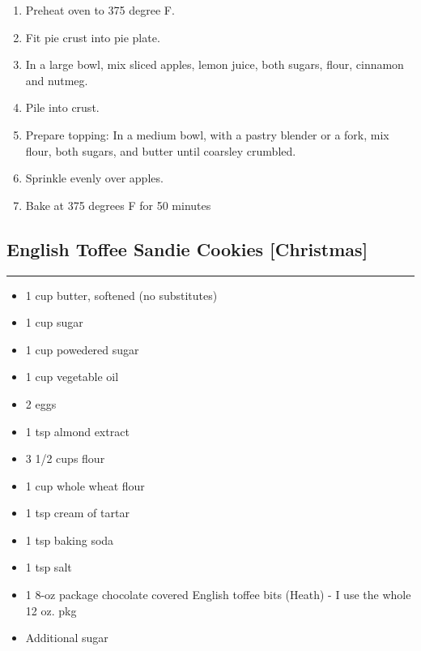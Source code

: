 \documentclass{article}
\begin{document}
\begin{enumerate}
    \item 
        Preheat oven to 375 degree F.
    \item
        Fit pie crust into pie plate.
    \item 
        In a large bowl, mix sliced apples, lemon juice, both sugars, flour, cinnamon and nutmeg.
    \item 
        Pile into crust.
    \item
        Prepare topping: In a medium bowl, with a pastry blender or a fork, mix flour, both sugars, and butter until coarsley crumbled.
    \item
        Sprinkle evenly over apples.
    \item 
        Bake at 375 degrees F for 50 minutes
\end{enumerate}
\newpage

\subsection{English Toffee Sandie Cookies [Christmas]} 
\noindent\rule[0.5ex]{\linewidth}{1pt}

\begin{framed}
\begin{itemize}
    \item 1 cup butter, softened (no substitutes)
    \item 1 cup sugar
    \item 1 cup powedered sugar
    \item 1 cup vegetable oil
    \item 2 eggs 
    \item 1 tsp almond extract
    \item 3 1/2 cups flour
    \item 1 cup whole wheat flour
    \item 1 tsp cream of tartar
    \item 1 tsp baking soda
    \item 1 tsp salt
    \item 1 8-oz package chocolate covered English toffee bits (Heath) - I use the whole 12 oz. pkg
    \item Additional sugar
\end{itemize}
\end{framed}
\end{document}
